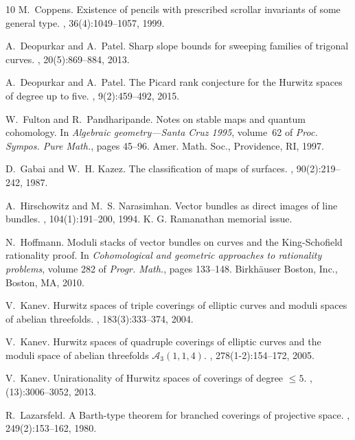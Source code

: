 \documentclass[11 pt]{amsart}
\numberwithin{equation}{section}
\begin{document}
\begin{thebibliography}{10}
M.~Coppens.
\newblock Existence of pencils with prescribed scrollar invariants of some
  general type.
, 36(4):1049--1057, 1999.

A.~Deopurkar and A.~Patel.
\newblock Sharp slope bounds for sweeping families of trigonal curves.
, 20(5):869--884, 2013.

A.~Deopurkar and A.~Patel.
\newblock The {P}icard rank conjecture for the {H}urwitz spaces of degree up to
  five.
, 9(2):459--492, 2015.

W.~Fulton and R.~Pandharipande.
\newblock Notes on stable maps and quantum cohomology.
\newblock In {\em Algebraic geometry---{S}anta {C}ruz 1995}, volume~62 of {\em
  Proc. Sympos. Pure Math.}, pages 45--96. Amer. Math. Soc., Providence, RI,
  1997.

D.~Gabai and W.~H. Kazez.
\newblock The classification of maps of surfaces.
, 90(2):219--242, 1987.

A.~Hirschowitz and M.~S. Narasimhan.
\newblock Vector bundles as direct images of line bundles.
, 104(1):191--200, 1994.
\newblock K. G. Ramanathan memorial issue.

N.~Hoffmann.
\newblock Moduli stacks of vector bundles on curves and the {K}ing-{S}chofield
  rationality proof.
\newblock In {\em Cohomological and geometric approaches to rationality
  problems}, volume 282 of {\em Progr. Math.}, pages 133--148. Birkh\"auser
  Boston, Inc., Boston, MA, 2010.

V.~Kanev.
\newblock Hurwitz spaces of triple coverings of elliptic curves and moduli
  spaces of abelian threefolds.
, 183(3):333--374, 2004.

V.~Kanev.
\newblock Hurwitz spaces of quadruple coverings of elliptic curves and the
  moduli space of abelian threefolds {${\mathcal A}_3(1,1,4)$}.
, 278(1-2):154--172, 2005.

V.~Kanev.
\newblock Unirationality of {H}urwitz spaces of coverings of degree {$\le5$}.
, (13):3006--3052, 2013.

R.~Lazarsfeld.
\newblock A {B}arth-type theorem for branched coverings of projective space.
, 249(2):153--162, 1980.


\end{thebibliography}
\end{document}
